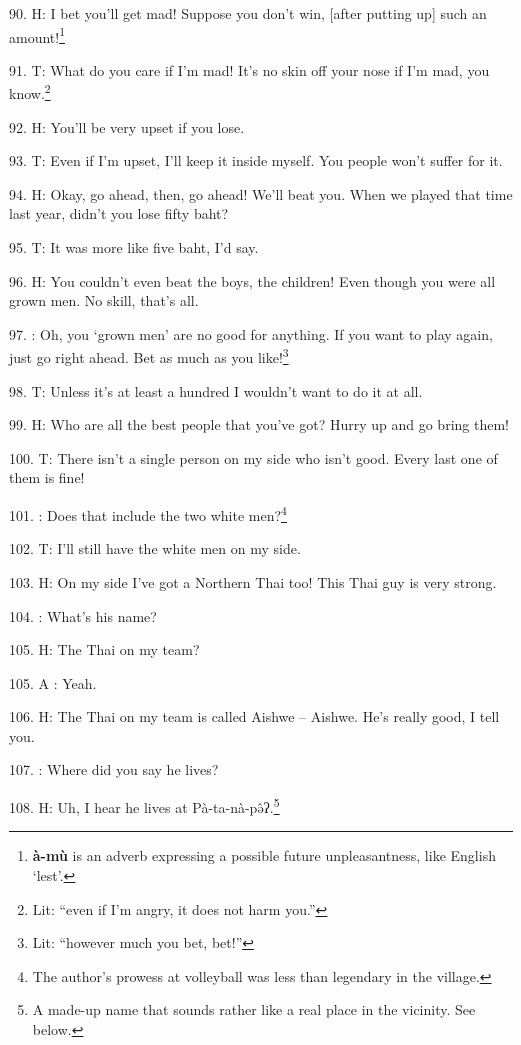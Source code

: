 90. H: I bet you'll get mad! Suppose you don't win, [after putting up] such an amount!\footnote{\textbf{à-mù} is an adverb expressing a possible future unpleasantness, like English `lest'.}

91. T: What do you care if I'm mad! It's no skin off your nose if I'm mad, you know.\footnote{Lit: ``even if I'm angry, it does not harm you.''}

92. H: You'll be very upset if you lose.

93. T: Even if I'm upset, I'll keep it inside myself. You people won't suffer for
it.

94. H: Okay, go ahead, then, go ahead! We'll beat you. When we played that time
last year, didn't you lose fifty baht?

95. T: It was more like five baht, I'd say.

96. H: You couldn't even beat the boys, the children! Even though you were all grown
men. No skill, that's all.

97. : Oh, you `grown men' are no good for anything. If you want to play again, just
go right ahead. Bet as much as you like!\footnote{Lit: ``however much you bet, bet!''}

98. T: Unless it's at least a hundred I wouldn't want to do it at all.

99. H: Who are all the best people that you've got? Hurry up and go bring them!

100. T: There isn't a single person on my side who isn't good. Every last one of
them is fine!

101. :  Does that include the two white men?\footnote{The author's prowess at volleyball was less than legendary in the village.}

102. T: I'll still have the white men on my side.

103. H: On my side I've got a Northern Thai too! This Thai guy is very strong.

104. : What's his name?

105. H: The Thai on my team?

105. A : Yeah.

106. H: The Thai on my team is called Aishwe -- Aishwe. He's really good, I tell
you.

107. : Where did you say he lives?

108. H: Uh, I hear he lives at Pà-ta-nà-pə̂ʔ.\footnote{A made-up name that sounds rather like a real place in the vicinity. See below.}


